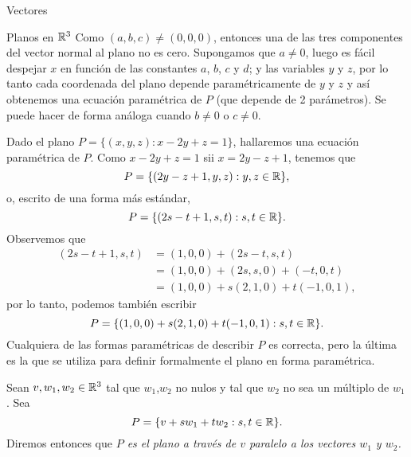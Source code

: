 \begin{chapter}{Vectores}
\begin{section}{Planos en $\mathbb R^3$}
        Como $(a,b,c) \ne (0,0,0)$,  entonces una de las tres componentes del vector normal al plano no es cero. Supongamos que $a\ne 0$,  luego es fácil despejar $x$ en función de las constantes $a$, $b$, $c$ y $d$; y las variables $y$ y $z$, por lo tanto cada coordenada del plano depende paramétricamente de $y$ y $z$ y así obtenemos una ecuación paramétrica de $P$ (que depende de 2 parámetros). Se puede hacer de forma análoga cuando $b\ne 0$ o $c \ne 0$. 
        
        \begin{ejemplo*}
            Dado el plano $P = \{(x,y,z): x -2y +z =1\}$,  hallaremos una ecuación paramétrica de $P$. Como  $x -2y +z =1$ sii  $x = 2y-z +1$, tenemos que
            \begin{equation*}
                P = \{(2y-z +1,y,z): y,z \in \mathbb R\},
            \end{equation*}
            o,  escrito de una forma más estándar,
            \begin{equation*}
            P = \{(2s-t +1,s,t): s,t \in \mathbb R\}. 
            \end{equation*}
            Observemos que 
            \begin{align*}
                (2s-t +1,s,t) &= (1,0,0) + (2s-t,s,t)\\
                &= (1,0,0) + (2s,s,0) + (-t,0,t)\\
                & = (1,0,0) + s(2,1,0) + t(-1,0,1),
            \end{align*}
            por lo tanto, podemos también escribir
            \begin{equation*}
            P = \{(1,0,0) + s(2,1,0) + t(-1,0,1): s,t \in \mathbb R\}. 
            \end{equation*}
            Cualquiera de las formas paramétricas de describir $P$  es correcta, pero la última es la que se utiliza para definir formalmente el plano en forma paramétrica. 
        \end{ejemplo*}
    
    \begin{definicion}
        Sean $v, w_1,w_2 \in \mathbb R^3$ tal que  $w_1$,$w_2$ no  nulos y tal que $w_2$ no sea un múltiplo de $w_1$. Sea 
        \begin{equation*}
        P = \{v + sw_1 + tw_2: s,t \in \mathbb R\}. 
        \end{equation*}
        Diremos entonces que  \textit{$P$ es el  plano a través de $v$ paralelo a los vectores $w_1$ y $w_2$.} 
    \end{definicion}
    

\end{section}
\end{chapter}
